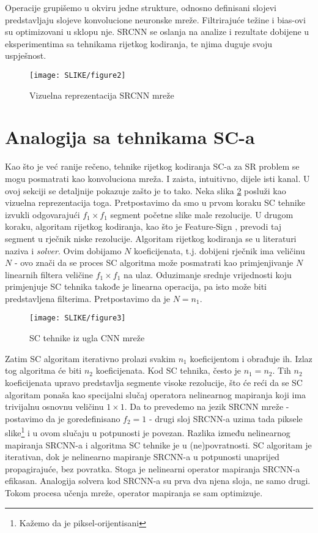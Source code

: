 \documentclass[12pt]{report}
\numberwithin{equation}{section}
\begin{document}
Operacije grupišemo u okviru jedne strukture, odnosno  definisani slojevi predstavljaju slojeve konvolucione neuronske mreže. Filtrirajuće težine i bias-ovi su optimizovani u sklopu nje. SRCNN se oslanja na analize i rezultate dobijene u eksperimentima sa tehnikama rijetkog kodiranja, te njima duguje svoju uspješnost. 

\begin{figure}[h]
\texttt{[image: SLIKE/figure2]}
\centering
\caption{Vizuelna reprezentacija SRCNN mreže \cite{main}}
\label{fig:srcnn}
\end{figure}


\section{Analogija sa tehnikama SC-a}\label{ch2}
Kao što je već ranije rečeno, tehnike rijetkog kodiranja SC-a za SR problem se mogu posmatrati kao konvoluciona mreža. I zaista, intuitivno, dijele isti kanal. U ovoj sekciji se detaljnije pokazuje zašto je to tako. Neka slika \ref{fig:rep} posluži kao vizuelna reprezentacija toga. 
Pretpostavimo da smo u prvom koraku SC tehnike izvukli odgovarajući $f_1 \times f_1$ segment početne slike male rezolucije. U drugom koraku, algoritam rijetkog kodiranja, kao što je Feature-Sign \cite{sparse}, prevodi taj segment u rječnik niske rezolucije. Algoritam rijetkog kodiranja se u literaturi naziva i \textit{solver}. Ovim dobijamo $N$ koeficijenata, t.j. dobijeni rječnik ima veličinu $N$ - ovo znači da se proces SC algoritma može posmatrati kao primjenjivanje $N$ linearnih filtera veličine $f_1 \times f_1$ na ulaz. Oduzimanje srednje vrijednosti koju primjenjuje SC tehnika takođe je linearna operacija, pa isto može biti predstavljena filterima. Pretpostavimo da je $N = n_1$. 


\begin{figure}[h]
\texttt{[image: SLIKE/figure3]}
\centering
\caption{SC tehnike iz ugla CNN mreže \cite{main}}
\label{fig:rep}
\end{figure}

Zatim SC algoritam iterativno prolazi svakim $n_1$ koeficijentom i obrađuje ih. Izlaz tog algoritma će biti $n_2$ koeficijenata. Kod SC tehnika, često je $n_1 = n_2$. Tih $n_2$ koeficijenata upravo predstavlja segmente visoke rezolucije, što će reći da se SC algoritam ponaša kao specijalni slučaj operatora nelinearnog mapiranja koji ima trivijalnu osnovnu veličinu $1 \times 1$. Da to prevedemo na jezik SRCNN mreže - postavimo da je goredefinisano $f_2 = 1$  - drugi sloj SRCNN-a uzima tada piksele slike\footnote{Kažemo da je piksel-orijentisani} i u ovom slučaju u potpunosti je povezan. Razlika između nelinearnog mapiranja SRCNN-a i algoritma SC tehnike je u (ne)povratnosti. SC algoritam je iterativan, dok je nelinearno mapiranje SRCNN-a u potpunosti unaprijed propagirajuće, bez povratka. Stoga je nelinearni operator mapiranja SRCNN-a efikasan. Analogija solvera kod SRCNN-a su prva dva njena sloja, ne samo drugi. Tokom procesa učenja mreže, operator mapiranja se sam optimizuje.     
\end{document}
